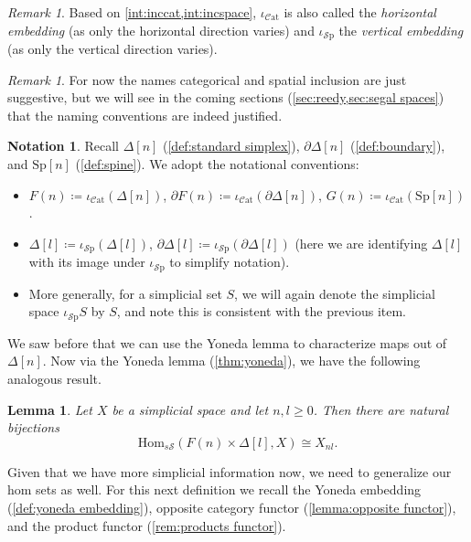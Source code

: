 \documentclass[11pt, a4paper]{amsart}
\newcommand{\Hom}{\mathrm{Hom}}
\newcommand{\sSp}{s\mathscr{S}}
\newcommand{\Cat}{\mathscr{C}\mathrm{at}}
\newcommand{\Sp}{\mathrm{Sp}}
\newcommand{\inccat}{\iota_{\Cat}}
\newcommand{\incspace}{\iota_{\mathscr{S}\mathrm{p}}}
\newtheorem{lemma}[equation]{Lemma}
\theoremstyle{definition}
\newtheorem{notation}[equation]{Notation}
\theoremstyle{remark}
\newtheorem{remark}[equation]{Remark}
\numberwithin{equation}{section}
\begin{document}
\begin{remark}
  Based on \cref{int:inccat,int:incspace}, $\inccat$ is also called the \emph{horizontal embedding} (as only the horizontal direction varies) and $\incspace$ the \emph{vertical embedding} (as only the vertical direction varies).
\end{remark}

\begin{remark}
 For now the names categorical and spatial inclusion are just suggestive, but we will see in the coming sections (\cref{sec:reedy,sec:segal spaces}) that the naming conventions are indeed justified.  
\end{remark}

\begin{notation} \label{not:FDelta}
  Recall $\Delta[n]$ (\cref{def:standard simplex}), $\partial \Delta[n]$ (\cref{def:boundary}), and $\Sp[n]$ (\cref{def:spine}). We adopt the notational conventions:
  \begin{itemize}[leftmargin=*]
    \item $F(n) \coloneq \inccat(\Delta[n])$, $\partial F(n) \coloneq \inccat(\partial \Delta[n])$, $G(n) \coloneq \inccat(\Sp[n])$.
    \item $\Delta[l] \coloneq \incspace(\Delta[l])$, $\partial \Delta[l] \coloneq \incspace(\partial \Delta[l])$ (here we are identifying $\Delta[l]$ with its image under $\incspace$ to simplify notation).
    \item More generally, for a simplicial set $S$, we will again denote the simplicial space $\incspace S$ by $S$, and note this is consistent with the previous item.
  \end{itemize} 
\end{notation} 

We saw before that we can use the Yoneda lemma to characterize maps out of $\Delta[n]$. Now via the Yoneda lemma (\cref{thm:yoneda}), we have the following analogous result.

\begin{lemma} \label{lemma:FDelta yoneda}
  Let $X$ be a simplicial space and let $n,l \geq 0$. Then there are natural bijections 
  \[
   \Hom_{\sSp}(F(n) \times \Delta[l], X) \cong X_{nl}.
  \]
\end{lemma}

Given that we have more simplicial information now, we need to generalize our hom sets as well. For this next definition we recall the Yoneda embedding (\cref{def:yoneda embedding}), opposite category functor (\cref{lemma:opposite functor}), and the product functor (\cref{rem:products functor}).
\end{document}
